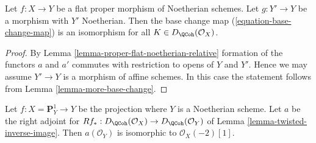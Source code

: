 \begin{lemma}
\label{lemma-proper-flat-base-change}
Let $f : X \to Y$ be a flat proper morphism of Noetherian schemes.
Let $g : Y' \to Y$ be a morphism with $Y'$ Noetherian. Then the base
change map (\ref{equation-base-change-map}) is an isomorphism
for all $K \in D_\QCoh(\mathcal{O}_X)$.
\end{lemma}

\begin{proof}
By Lemma \ref{lemma-proper-flat-noetherian-relative} formation of the
functors $a$ and $a'$ commutes with restriction to opens of $Y$ and $Y'$.
Hence we may assume $Y' \to Y$ is a morphism of affine schemes. In this
case the statement follows from Lemma \ref{lemma-more-base-change}.
\end{proof}

\begin{lemma}
\label{lemma-upper-shriek-P1}
Let $f : X = \mathbf{P}^1_Y \to Y$ be the projection where $Y$ is
a Noetherian scheme. Let $a$ be the right adjoint for
$Rf_* : D_\QCoh(\mathcal{O}_X) \to D_\QCoh(\mathcal{O}_Y)$ of
Lemma \ref{lemma-twisted-inverse-image}.
Then $a(\mathcal{O}_Y)$ is isomorphic to $\mathcal{O}_X(-2)[1]$.
\end{lemma}

